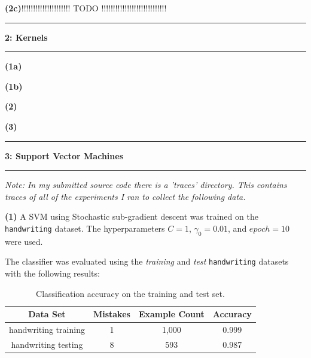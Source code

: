 \documentclass[11pt]{article}
\newcommand\question[2]{\vspace{.25in}\hrule\textbf{#1: #2}\vspace{.5em}\hrule\vspace{.10in}}
\renewcommand\part[1]{\vspace{.10in}\textbf{(#1)}}
\begin{document}
\part{2c}!!!!!!!!!!!!!!!!!!!!! TODO !!!!!!!!!!!!!!!!!!!!!!!!!!!!

\question{2}{Kernels}

\part{1a}

\part{1b}

\part{2}

\part{3}

\question{3}{Support Vector Machines}
\textit{Note: In my submitted source code there is a 'traces' directory. This contains traces of all of the experiments I ran to collect the following data.}

\part{1} A SVM using Stochastic sub-gradient descent was trained on the {\tt handwriting} dataset. The hyperparameters $C = 1$, $\gamma_0 = 0.01$, and $epoch = 10$ were used.

The classifier was evaluated using the \textit{training} and \textit{test} {\tt handwriting} datasets with the following results:

 \begin{table}[H]
\centering
{\renewcommand{\arraystretch}{1.2}%
\begin{tabular}{| c | c | c | c |}
\hline
Data Set & Mistakes & Example Count & Accuracy\\
\hline
handwriting training & 1 & 1,000 & 0.999\\ \hline
handwriting testing & 8 & 593 & 0.987\\ \hline
\end{tabular}}
\caption{Classification accuracy on the training and test set.}
\end{table}
\end{document}
